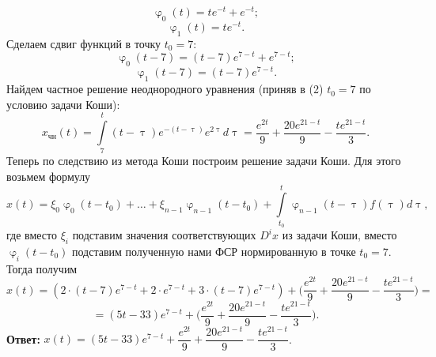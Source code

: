 \documentclass[a4paper, 12pt]{article}
\renewcommand{\varphi}{\upvarphi}
\begin{document}
$$\varphi_0(t) = te^{-t} + e^{-t};$$
$$\varphi_1(t) =  te^{-t}.$$
Сделаем сдвиг функций в точку $t_0 = 7$:
$$\varphi_0(t - 7) = (t-7)e^{7-t} + e^{7-t};$$
$$\varphi_1(t - 7) =  (t-7)e^{7-t}.$$
Найдем частное решение неоднородного уравнения (приняв в (2) $t_0 = 7$ по условию задачи Коши):
$$x_\text{чн}(t) = \int\limits_{7}^t(t - \uptau)e^{-(t-\uptau)}e^{2\uptau}d\uptau = \dfrac{e^{2t}}{9} + \dfrac{20e^{21-t}}{9} - \dfrac{te^{21-t}}{3}.$$
Теперь по следствию из метода Коши построим решение задачи Коши. Для этого возьмем формулу $$x(t) = \xi_0\varphi_0(t-t_0)+\ldots+\xi_{n-1}\varphi_{n-1}(t-t_0) + \int\limits_{t_0}^{t}\varphi_{n-1}(t-\uptau)f(\uptau)d\uptau,$$ где вместо $\xi_i$ подставим значения соответствующих $D^ix$ из задачи Коши, вместо $\varphi_i(t-t_0)$ подставим полученную нами ФСР нормированную в точке $t_0 = 7$. Тогда получим $$x(t) = (2\cdot (t-7)e^{7-t} + 2\cdot e^{7-t} + 3\cdot(t-7)e^{7-t}) + \Big(\dfrac{e^{2t}}{9} + \dfrac{20e^{21-t}}{9} - \dfrac{te^{21-t}}{3}\Big)=$$
$$ = (5t - 33)e^{7-t} + \Big(\dfrac{e^{2t}}{9} + \dfrac{20e^{21-t}}{9} - \dfrac{te^{21-t}}{3}\Big).$$
\textbf{Ответ:} $x(t) = (5t - 33)e^{7-t} + \dfrac{e^{2t}}{9} + \dfrac{20e^{21-t}}{9} - \dfrac{te^{21-t}}{3}$.
\end{document}
